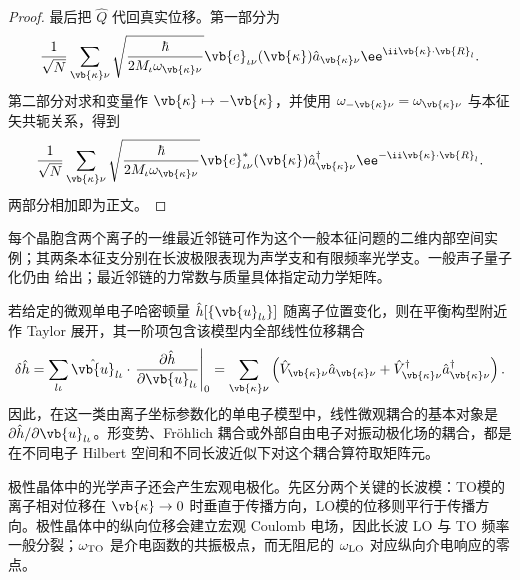 \begin{proof}
最后把 $\hat Q$ 代回真实位移。第一部分为
\[
\frac1{\sqrt N}\sum_{\vb{\kappa}\nu}
\sqrt{\frac{\hbar}{2M_\iota\omega_{\vb{\kappa}\nu}}}
\vb{e}_{\iota\nu}(\vb{\kappa})
\hat a_{\vb{\kappa}\nu}
\ee^{\ii\vb{\kappa}\cdot\vb{R}_l}.
\]
第二部分对求和变量作 $\vb{\kappa}\mapsto-\vb{\kappa}$，并使用
$\omega_{-\vb{\kappa}\nu}=\omega_{\vb{\kappa}\nu}$ 与本征矢共轭关系，得到
\[
\frac1{\sqrt N}\sum_{\vb{\kappa}\nu}
\sqrt{\frac{\hbar}{2M_\iota\omega_{\vb{\kappa}\nu}}}
\vb{e}_{\iota\nu}^*(\vb{\kappa})
\hat a_{\vb{\kappa}\nu}^\dagger
\ee^{-\ii\vb{\kappa}\cdot\vb{R}_l}.
\]
两部分相加即为正文。
\end{proof}


每个晶胞含两个离子的一维最近邻链可作为这个一般本征问题的二维内部空间实例；其两条本征支分别在长波极限表现为声学支和有限频率光学支。一般声子量子化仍由 给出；最近邻链的力常数与质量具体指定动力学矩阵。

若给定的微观单电子哈密顿量 $\hat h[\{\vb{u}_{l\iota}\}]$ 随离子位置变化，则在平衡构型附近作 Taylor 展开，其一阶项包含该模型内全部线性位移耦合
\begin{equation*}
\delta\hat h
=\sum_{l\iota}\hat{\vb{u}}_{l\iota}\cdot
\left.\frac{\partial\hat h}{\partial\vb{u}_{l\iota}}\right|_0
=\sum_{\vb{\kappa}\nu}
\left(\hat V_{\vb{\kappa}\nu}\hat a_{\vb{\kappa}\nu}
+\hat V_{\vb{\kappa}\nu}^{\dagger}\hat a_{\vb{\kappa}\nu}^{\dagger}\right).
\end{equation*}
因此，在这一类由离子坐标参数化的单电子模型中，线性微观耦合的基本对象是 $\partial\hat h/\partial\vb{u}_{l\iota}$。形变势、Fr\"ohlich 耦合或外部自由电子对振动极化场的耦合，都是在不同电子 Hilbert 空间和不同长波近似下对这个耦合算符取矩阵元。

极性晶体中的光学声子还会产生宏观电极化。先区分两个关键的长波模：TO模的离子相对位移在 $\vb{\kappa}\to0$ 时垂直于传播方向，LO模的位移则平行于传播方向。极性晶体中的纵向位移会建立宏观 Coulomb 电场，因此长波 LO 与 TO 频率一般分裂；$\omega_{\rm TO}$ 是介电函数的共振极点，而无阻尼的 $\omega_{\rm LO}$ 对应纵向介电响应的零点。

